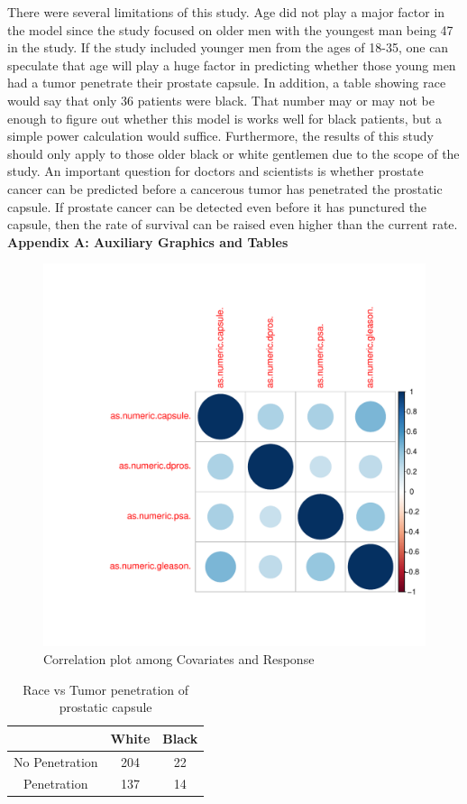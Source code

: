 \documentclass{article}\usepackage[]{graphicx}\usepackage[]{color}
\makeatletter
\newenvironment{kframe}{%
 \def\at@end@of@kframe{}%
 \ifinner\ifhmode%
  \def\at@end@of@kframe{\end{minipage}}%
  \begin{minipage}{\columnwidth}%
 \fi\fi%
 \def\FrameCommand##1{\hskip\@totalleftmargin \hskip-\fboxsep
 \colorbox{shadecolor}{##1}\hskip-\fboxsep
     \hskip-\linewidth \hskip-\@totalleftmargin \hskip\columnwidth}%
 \MakeFramed {\advance\hsize-\width
   \@totalleftmargin\z@ \linewidth\hsize
   \@setminipage}}%
 {\par\unskip\endMakeFramed%
 \at@end@of@kframe}
\newenvironment{knitrout}{}{} %
\makeatother
\begin{document}
There were several limitations of this study. Age did not play a major factor in the model since the study focused on older men with the youngest man being 47 in the study. If the study included younger men from the ages of 18-35, one can speculate that age will play a huge factor in predicting whether those young men had a tumor penetrate their prostate capsule. 
In addition, a table showing race would say that only 36 patients were black. That number may or may not be enough to figure out whether this model is works well for black patients, but a simple power calculation would suffice. Furthermore, the results of this study should only apply to those older black or white gentlemen due to the scope of the study.
An important question for doctors and scientists is whether prostate cancer can be predicted before a cancerous tumor has penetrated the prostatic capsule. If prostate cancer can be detected even before it has punctured the capsule, then the rate of survival can be raised even higher than the current rate. 
\newpage
\noindent \Large{{\bf Appendix A: Auxiliary Graphics and Tables}}
\begin{figure}
\caption{Correlation plot among Covariates and Response}
\label{corrplot}
\begin{knitrout}
\color{fgcolor}\begin{kframe}


{\ttfamily\noindent\itshape\color{messagecolor}{\#\# corrplot 0.84 loaded}}\end{kframe}
\includegraphics[width=0.5\linewidth,height=0.5\textheight]{figure/Corrplot-1} 

\end{knitrout}
\end{figure}

\begin{table}
\begin{center}
\caption{Race vs Tumor penetration of prostatic capsule}
\label{race}
\begin{tabular}{c|c|c}
 & White & Black \\ \hline
No Penetration & 204 & 22\\
Penetration & 137 & 14 \\
\end{tabular}
\end{center}
\end{table}
\end{document}
